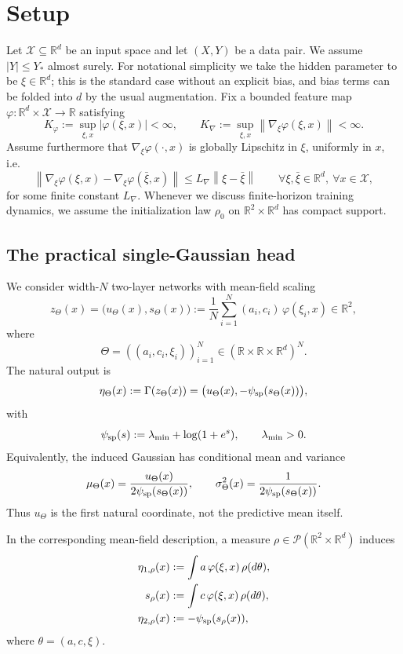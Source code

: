 \documentclass[11pt]{article}
\theoremstyle{definition}
\newcommand{\R}{\mathbb{R}}
\newcommand{\norm}[1]{\left\lVert #1 \right\rVert}
\newcommand{\mc}[1]{\mathcal{#1}}
\begin{document}
\section{Setup}

Let $\mc{X}\subseteq\R^d$ be an input space and let $(X,Y)$ be a data pair. We
assume $|Y|\le Y_\ast$ almost surely. For notational simplicity we take the
hidden parameter to be $\xi\in\R^d$; this is the standard case without an
explicit bias, and bias terms can be folded into $d$ by the usual augmentation.
Fix a bounded feature map $\varphi:\R^d\times\mc{X}\to\R$ satisfying
\[
  K_\varphi:=\sup_{\xi,x}|\varphi(\xi,x)|<\infty,
  \qquad
  K_{\nabla}:=\sup_{\xi,x}\norm{\nabla_\xi \varphi(\xi,x)}<\infty.
\]
Assume furthermore that $\nabla_\xi\varphi(\cdot,x)$ is globally Lipschitz in
$\xi$, uniformly in $x$, i.e.
\[
  \norm{\nabla_\xi\varphi(\xi,x)-\nabla_\xi\varphi(\bar\xi,x)}
  \le
  L_{\nabla}\norm{\xi-\bar\xi}
  \qquad
  \forall \xi,\bar\xi\in\R^d,\ \forall x\in\mc{X},
\]
for some finite constant $L_{\nabla}$.
Whenever we discuss finite-horizon training dynamics, we assume the
initialization law $\rho_0$ on $\R^2\times\R^d$ has compact support.

\subsection{The practical single-Gaussian head}

We consider width-$N$ two-layer networks with mean-field scaling
\begin{equation}
  z_\Theta(x)
  =
  \bigl(u_\Theta(x),s_\Theta(x)\bigr)
  :=
  \frac1N\sum_{i=1}^N (a_i,c_i)\,\varphi(\xi_i,x)
  \in \R^2,
  \label{eq:raw_head}
\end{equation}
where
\[
  \Theta=((a_i,c_i,\xi_i))_{i=1}^N\in(\R\times\R\times\R^d)^N.
\]
The natural output is
\begin{equation}
  \eta_\Theta(x)
  :=
  \Gamma(z_\Theta(x))
  =
  \bigl(u_\Theta(x),-\psi_{\rm sp}(s_\Theta(x))\bigr),
  \label{eq:natural_head}
\end{equation}
with
\[
  \psi_{\rm sp}(s):=\lambda_{\min}+\log(1+e^s),
  \qquad
  \lambda_{\min}>0.
\]
Equivalently, the induced Gaussian has conditional mean and variance
\[
  \mu_\Theta(x)=\frac{u_\Theta(x)}{2\psi_{\rm sp}(s_\Theta(x))},
  \qquad
  \sigma_\Theta^2(x)=\frac{1}{2\psi_{\rm sp}(s_\Theta(x))}.
\]
Thus $u_\Theta$ is the first natural coordinate, not the predictive mean
itself.

In the corresponding mean-field description, a measure
$\rho\in\mc{P}(\R^2\times\R^d)$ induces
\begin{align}
  \eta_{1,\rho}(x)
  &:=
  \int a\,\varphi(\xi,x)\,\rho(d\theta),
  \\
  s_\rho(x)
  &:=
  \int c\,\varphi(\xi,x)\,\rho(d\theta),
  \\
  \eta_{2,\rho}(x)
  &:=
  -\psi_{\rm sp}(s_\rho(x)),
\end{align}
where $\theta=(a,c,\xi)$.
\end{document}
